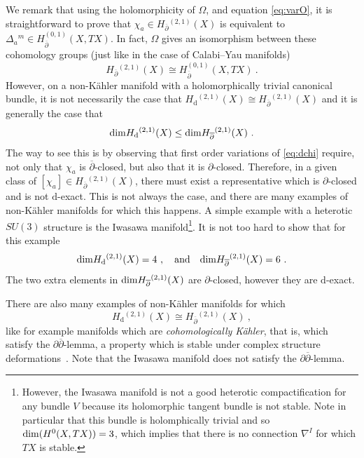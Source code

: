 \documentclass[12pt,a4paper]{article}
\def\bar#1{\overline{#1}}
\let\p=\partial
\def\d{\textrm{d}}
\def\bp{\bar{\partial}}
\theoremstyle{definition}
\begin{document}
We remark that using the holomorphicity of $\Omega$, and equation \eqref{eq:varO}, it is straightforward to prove that $\chi_a\in H_{\bp}{}^{(2,1)}(X)$ is equivalent to $\Delta_a{}^m \in H^{(0,1)}_{\bar\partial}(X,TX)$.  In fact, $\Omega$ gives an isomorphism between these cohomology groups (just like in the case of Calabi--Yau manifolds)~\citep{MR915841}
\[H_{\bp}{}^{(2,1)}(X)\cong H^{(0,1)}_{\bar\partial}(X,TX)~.\] 
However, on a non-K\"ahler manifold with a holomorphically trivial canonical bundle, it is not necessarily the case that
$H_{\d}{}^{(2,1)}(X) \cong H_{\bp}{}^{(2,1)}(X)$
and it is generally the case that 
\[ {\rm dim} H_{\d}{}^{(2,1)}(X) \le {\rm dim} H_{\bp}{}^{(2,1)}(X)~.\]
The way to see this is by observing that first order variations of  \eqref{eq:dchi} require, not only that $\chi_a$ is $\bp$-closed, but also that it is $\p$-closed. Therefore, in a given class of $[\chi_a]\in H_{\bp}{}^{(2,1)}(X)$, there must exist a representative which is  $\p$-closed and is not $\d$-exact.  This is not always the case, and there are many examples of non-K\"ahler manifolds for which this happens.  A simple example with a heterotic $SU(3)$ structure is the Iwasawa manifold\footnote{However, the Iwasawa manifold is not a good heterotic compactification for any bundle $V$ because its holomorphic tangent bundle is not stable.  Note in particular that this bundle is holomphically trivial and so ${\rm dim}(H^0(X,TX)) = 3$, which implies that there is no connection $\nabla^I$ for which $TX$ is stable.}.  It is not too hard to show that for this example~\citep{MR0393580}
\[ {\rm dim} H_{\d}{}^{(2,1)}(X) = 4~,\quad{\rm and} \quad {\rm dim} H_{\bp}{}^{(2,1)}(X) = 6~.\]
The two extra elements in ${\rm dim} H_{\bp}{}^{(2,1)}(X)$ are $\p$-closed, however they are $\d$-exact. 

There are also many examples of non-K\"ahler manifolds for which 
\begin{equation} H_{\d}{}^{(2,1)}(X)\cong H_{\bp}{}^{(2,1)}(X)~,
\label{eq:CScong}
\end{equation}
like for example manifolds which are {\it cohomologically K\"ahler}, that is, which satisfy the $\p\bp$-lemma, a property which is stable under complex structure deformations~\citep{MR2451566,MR2449178}.  Note that the Iwasawa manifold does not satisfy the $\p\bp$-lemma.
\end{document}
